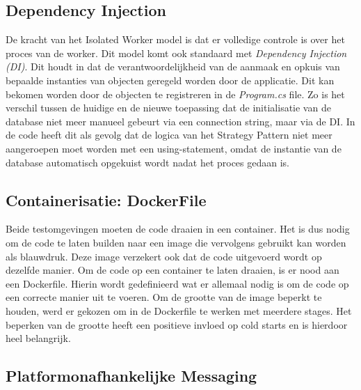 \subsection{Dependency Injection}

De kracht van het Isolated Worker model is dat er volledige controle is over het proces van de worker. Dit model komt ook standaard met \textit{Dependency Injection (DI)}. Dit houdt in dat de verantwoordelijkheid van de aanmaak en opkuis van bepaalde instanties van objecten geregeld worden door de applicatie. Dit kan bekomen worden door de objecten te registreren in de \textit{Program.cs} file. Zo is het verschil tussen de huidige en de nieuwe toepassing dat de initialisatie van de database niet meer manueel gebeurt via een connection string, maar via de DI. In de code heeft dit als gevolg dat de logica van het Strategy Pattern niet meer aangeroepen moet worden met een using-statement, omdat de instantie van de database automatisch opgekuist wordt nadat het proces gedaan is.

\subsection{Containerisatie: DockerFile}
Beide testomgevingen moeten de code draaien in een container. Het is dus nodig om de code te laten builden naar een image die vervolgens gebruikt kan worden als blauwdruk. Deze image verzekert ook dat de code uitgevoerd wordt op dezelfde manier. Om de code op een container te laten draaien, is er nood aan een Dockerfile. Hierin wordt gedefinieerd wat er allemaal nodig is om de code op een correcte manier uit te voeren. Om de grootte van de image beperkt te houden, werd er gekozen om in de Dockerfile te werken met meerdere stages. Het beperken van de grootte heeft een positieve invloed op cold starts en is hierdoor heel belangrijk.

\subsection{Platformonafhankelijke Messaging}
\label{ch:messaging-queue}

